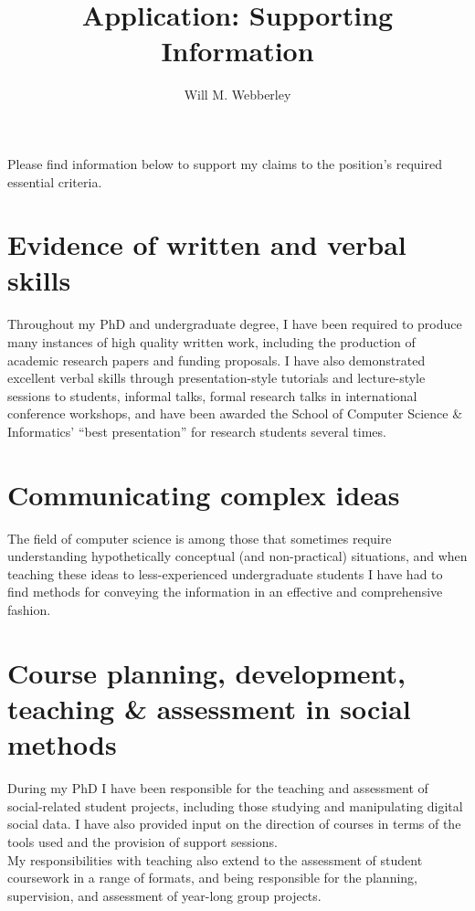 \documentclass[10pt,a4paper]{article}
\title{Application:	 Supporting Information}
\author{Will M. Webberley}
\date{}
\begin{document}
\maketitle

Please find information below to support my claims to the position's required essential criteria.

\section*{Evidence of written and verbal skills}
Throughout my PhD and undergraduate degree, I have been required to produce many instances of high quality written work, including the production of academic research papers and funding proposals. I have also demonstrated excellent verbal skills through presentation-style tutorials and lecture-style sessions to students, informal talks, formal research talks in international conference workshops, and have been awarded the School of Computer Science \& Informatics' ``best presentation'' for research students several times.

\section*{Communicating complex ideas}
The field of computer science is among those that sometimes require understanding hypothetically conceptual (and non-practical) situations, and when teaching these ideas to less-experienced undergraduate students I have had to find methods for conveying the information in an effective and comprehensive fashion.\\

\section*{Course planning, development, teaching \& assessment in social methods}
During my PhD I have been responsible for the teaching and assessment of social-related student projects, including those studying and manipulating digital social data. I have also provided input on the direction of courses in terms of the tools used and the provision of support sessions.\\
My responsibilities with teaching also extend to the assessment of student coursework in a range of formats, and being responsible for the planning, supervision, and assessment of year-long group projects.
\end{document}
